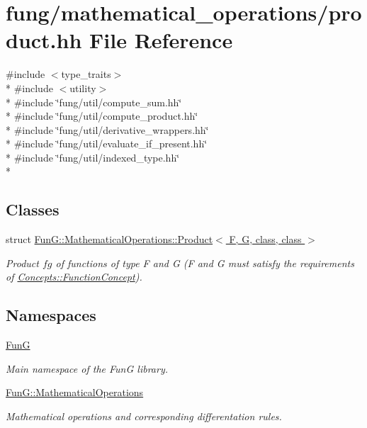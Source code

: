 \hypertarget{product_8hh}{}\section{fung/mathematical\+\_\+operations/product.hh File Reference}
\label{product_8hh}
{\ttfamily \#include $<$type\+\_\+traits$>$}\\*
{\ttfamily \#include $<$utility$>$}\\*
{\ttfamily \#include \char`\"{}fung/util/compute\+\_\+sum.\+hh\char`\"{}}\\*
{\ttfamily \#include \char`\"{}fung/util/compute\+\_\+product.\+hh\char`\"{}}\\*
{\ttfamily \#include \char`\"{}fung/util/derivative\+\_\+wrappers.\+hh\char`\"{}}\\*
{\ttfamily \#include \char`\"{}fung/util/evaluate\+\_\+if\+\_\+present.\+hh\char`\"{}}\\*
{\ttfamily \#include \char`\"{}fung/util/indexed\+\_\+type.\+hh\char`\"{}}\\*
\subsection*{Classes}
\begin{DoxyCompactItemize}
\item 
struct \hyperlink{structFunG_1_1MathematicalOperations_1_1Product}{Fun\+G\+::\+Mathematical\+Operations\+::\+Product$<$ F, G, class, class $>$}
\begin{DoxyCompactList}\small\item\em Product $fg$ of functions of type F and G (F and G must satisfy the requirements of \hyperlink{structFunG_1_1Concepts_1_1FunctionConcept}{Concepts\+::\+Function\+Concept}). \end{DoxyCompactList}\end{DoxyCompactItemize}
\subsection*{Namespaces}
\begin{DoxyCompactItemize}
\item 
 \hyperlink{namespaceFunG}{Fun\+G}
\begin{DoxyCompactList}\small\item\em Main namespace of the Fun\+G library. \end{DoxyCompactList}\item 
 \hyperlink{namespaceFunG_1_1MathematicalOperations}{Fun\+G\+::\+Mathematical\+Operations}
\begin{DoxyCompactList}\small\item\em Mathematical operations and corresponding differentation rules. \end{DoxyCompactList}\end{DoxyCompactItemize}

